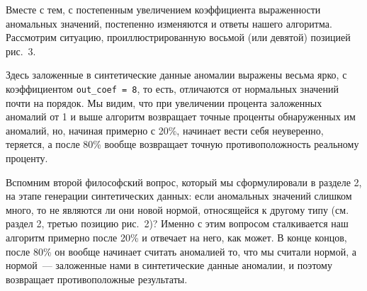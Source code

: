 \documentclass[a4paper,12pt]{article}
\begin{document}
Вместе с тем, с постепенным увеличением коэффициента выраженности аномальных значений, постепенно изменяются и ответы нашего алгоритма. Рассмотрим ситуацию, проиллюстрированную восьмой (или девятой) позицией рис. 3. 

Здесь заложенные в синтетические данные аномалии выражены весьма ярко, с коэффициентом \texttt{out\_coef = 8}, то есть, отличаются от нормальных значений почти на порядок. Мы видим, что при увеличении процента заложенных аномалий от 1 и выше алгоритм возвращает точные проценты обнаруженных им аномалий, но, начиная примерно с 20\%, начинает вести себя неуверенно, теряется, а после 80\% вообще возвращает точную противоположность  реальному проценту.

Вспомним второй философский вопрос, который мы сформулировали в разделе 2, на этапе генерации синтетических данных: если аномальных значений слишком много, то не являются ли они новой нормой, относящейся к другому типу (см. раздел 2, третью позицию рис. 2)? Именно с этим вопросом сталкивается наш алгоритм примерно после 20\% и отвечает на него, как может. В конце концов, после 80\% он вообще начинает считать аномалией то, что мы считали нормой, а нормой — заложенные нами в синтетические данные аномалии, и поэтому возвращает противоположные результаты.
\end{document}
